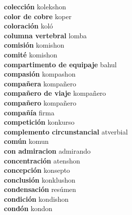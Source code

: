 \textbf{ colección  } kolekshon \\
\textbf{ color de cobre  } koper \\
\textbf{ coloración  } koló \\
\textbf{ columna vertebral  } lomba \\
\textbf{ comisión  } komishon \\
\textbf{ comité  } komishon \\
\textbf{ compartimento de equipaje  } bahul \\
\textbf{ compasión  } kompashon \\
\textbf{ compañera  } kompañero \\
\textbf{ compañero de viaje  } kompañero \\
\textbf{ compañero  } kompañero \\
\textbf{ compañía  } firma \\
\textbf{ competición  } konkurso \\
\textbf{ complemento circunstancial  } atverbial \\
\textbf{ común  } komun \\
\textbf{ con admiracion  } admirando \\
\textbf{ concentración  } atenshon \\
\textbf{ concepción  } konsepto \\
\textbf{ conclusión  } konklushon \\
\textbf{ condensación  } resúmen \\
\textbf{ condición  } kondishon \\
\textbf{ condón  } kondon \\
